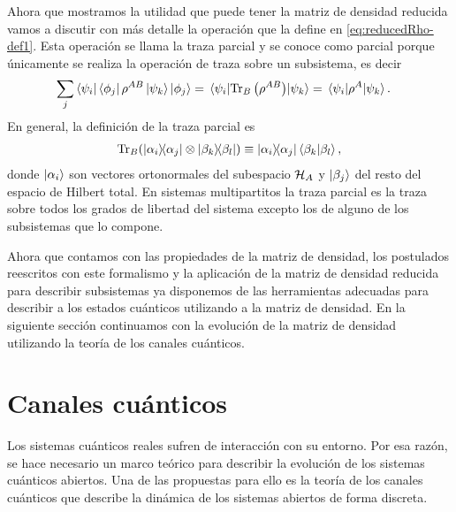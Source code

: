Ahora que mostramos la utilidad que puede tener la matriz de densidad
reducida vamos a discutir con más detalle la operación que la define en
\eqref{eq:reducedRho-def1}. 
Esta operación se llama la traza parcial y se conoce como parcial 
porque únicamente se realiza la operación de traza sobre un subsistema, 
es decir
\begin{align} 
	\sum _j \bra{\psi_i}\bra{\phi_j}\rho^{AB}\ket{\psi_k}\ket{\phi_j}
	&=\matrixel{\psi_i}{\Tr_B\qty(\rho^{AB})}{\psi_k}
	= \matrixel{\psi_i}{\rho^A}{\psi_k}.
	\label{eq:partialTrace-def}
\end{align}
En general, la definición de la traza parcial es \cite{nielsen_chuang_2011}
\begin{align}
	\Tr_B (\dyad{\alpha_i}{\alpha_j}\otimes \dyad{\beta_k}{\beta_l})
	\equiv
	\dyad{\alpha_i}{\alpha_j}\braket{\beta_k}{\beta_l},
	\label{eq:part_trace-def}
\end{align}
donde $\ket{\alpha_i}$ son vectores ortonormales del subespacio $\mathcal{H}_A$
y $\ket{\beta_j}$ del resto del espacio de Hilbert total. En sistemas 
multipartitos la traza parcial es la traza sobre 
todos los grados de libertad del sistema excepto los de alguno de los 
subsistemas que lo compone.

Ahora que contamos con las propiedades de la matriz de densidad, 
los postulados reescritos con este formalismo y la aplicación de la matriz
de densidad reducida para describir subsistemas ya disponemos de
las herramientas adecuadas para describir a los estados cuánticos 
utilizando a la matriz de densidad. En la siguiente sección continuamos 
con la evolución de la matriz de densidad utilizando la teoría de los 
canales cuánticos.

\section{Canales cuánticos}\label{sec:qtm-channels} %

Los sistemas cuánticos reales sufren de interacción con su entorno.
Por esa razón, se hace necesario un marco teórico para describir 
la evolución de los sistemas cuánticos abiertos. Una de las propuestas
para ello es la teoría de los canales cuánticos que describe la dinámica de 
los sistemas abiertos de forma discreta. 

